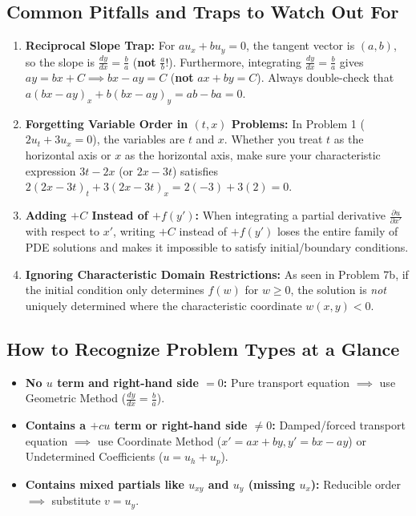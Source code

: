 \documentclass[11pt]{article}
\begin{document}
\subsection{Common Pitfalls and Traps to Watch Out For}
\begin{enumerate}
    \item \textbf{Reciprocal Slope Trap:} For $au_x + bu_y = 0$, the tangent vector is $(a, b)$, so the slope is $\frac{dy}{dx} = \frac{b}{a}$ (\textbf{not} $\frac{a}{b}$!). Furthermore, integrating $\frac{dy}{dx} = \frac{b}{a}$ gives $ay = bx + C \implies bx - ay = C$ (\textbf{not} $ax + by = C$). Always double-check that $a(bx - ay)_x + b(bx - ay)_y = ab - ba = 0$.
    \item \textbf{Forgetting Variable Order in $(t, x)$ Problems:} In Problem 1 ($2u_t + 3u_x = 0$), the variables are $t$ and $x$. Whether you treat $t$ as the horizontal axis or $x$ as the horizontal axis, make sure your characteristic expression $3t - 2x$ (or $2x - 3t$) satisfies $2(2x - 3t)_t + 3(2x - 3t)_x = 2(-3) + 3(2) = 0$.
    \item \textbf{Adding $+C$ Instead of $+f(y')$:} When integrating a partial derivative $\frac{\partial u}{\partial x'}$ with respect to $x'$, writing $+C$ instead of $+f(y')$ loses the entire family of PDE solutions and makes it impossible to satisfy initial/boundary conditions.
    \item \textbf{Ignoring Characteristic Domain Restrictions:} As seen in Problem 7b, if the initial condition only determines $f(w)$ for $w \ge 0$, the solution is \emph{not} uniquely determined where the characteristic coordinate $w(x, y) < 0$.
\end{enumerate}

\subsection{How to Recognize Problem Types at a Glance}
\begin{itemize}
    \item \textbf{No $u$ term and right-hand side $= 0$:} Pure transport equation $\implies$ use Geometric Method ($\frac{dy}{dx} = \frac{b}{a}$).
    \item \textbf{Contains a $+cu$ term or right-hand side $\neq 0$:} Damped/forced transport equation $\implies$ use Coordinate Method ($x' = ax+by, y' = bx-ay$) or Undetermined Coefficients ($u = u_h + u_p$).
    \item \textbf{Contains mixed partials like $u_{xy}$ and $u_y$ (missing $u_x$):} Reducible order $\implies$ substitute $v = u_y$.
\end{itemize}
\end{document}
